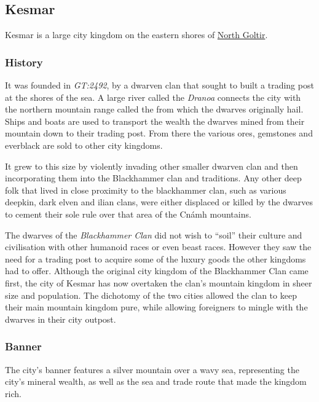 \subsection{Kesmar}
\label{sec:Kesmar}

Kesmar is a large city kingdom on the eastern shores of
\hyperref[sec:Goltir]{North Goltir}.

\subsubsection{History}

It was founded in \emph{GT:2492}, by a dwarven clan that sought to built a
trading post at the shores of the sea. A large river called the \emph{Dranoa}
connects the city with the northern mountain range called the
 from which the dwarves originally hail. Ships
and boats are used to transport the wealth the dwarves mined from their
mountain down to their trading post. From there the various ores, gemstones
and everblack are sold to other city kingdoms.

It grew to this size by violently invading other smaller dwarven clan and then
incorporating them into the Blackhammer clan and traditions. Any other deep
folk that lived in close proximity to the blackhammer clan, such as various
deepkin, dark elven and ilian clans, were either displaced or killed by the
dwarves to cement their sole rule over that area of the Cnámh mountains.

The dwarves of the \emph{Blackhammer Clan} did not wish to ``soil'' their
culture and civilisation with other humanoid races or even beast
races. However they saw the need for a trading post to acquire some of the
luxury goods the other kingdoms had to offer. Although the original city
kingdom of the Blackhammer Clan came first, the city of Kesmar has now
overtaken the clan's mountain kingdom in sheer size and population. The
dichotomy of the two cities allowed the clan to keep their main mountain
kingdom pure, while allowing foreigners to mingle with the dwarves in their
city outpost.

\subsubsection{Banner}

The city's banner features a silver mountain over a wavy sea, representing the
city's mineral wealth, as well as the sea and trade route that made the
kingdom rich.

